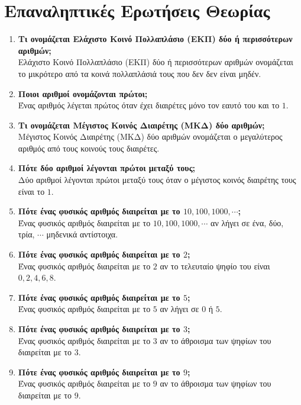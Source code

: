 \documentclass[a4paper,11pt]{report}
\begin{document}
\section*{Επαναληπτικές Ερωτήσεις Θεωρίας \hfill \small{}}
\begin{enumerate}
\item \textbf{Τι ονομάζεται Ελάχιστο Κοινό Πολλαπλάσιο (ΕΚΠ) δύο ή περισσότερων αριθμών;}\\
      Ελάχιστο Κοινό Πολλαπλάσιο (ΕΚΠ) δύο ή περισσότερων αριθμών ονομάζεται το μικρότερο από τα κοινά 
      πολλαπλάσιά τους που δεν  δεν είναι μηδέν.
\item \textbf{Ποιοι αριθμοί ονομάζονται πρώτοι;}\\
      Ένας αριθμός λέγεται πρώτος όταν έχει διαιρέτες μόνο τον εαυτό του και το $1$.
\item \textbf{Τι ονομάζεται Μέγιστος Κοινός Διαιρέτης (ΜΚΔ) δύο αριθμών;}\\
      Μέγιστος Κοινός Διαιρέτης (ΜΚΔ) δύο αριθμών ονομάζεται ο μεγαλύτερος αριθμός από τους κοινούς 
      τους διαιρέτες.
\item \textbf{Πότε δύο αριθμοί λέγονται πρώτοι μεταξύ τους;}\\
       Δύο αριθμοί λέγονται πρώτοι μεταξύ τους όταν ο μέγιστος κοινός διαιρέτης τους είναι το $1$.
\item \textbf{Πότε ένας φυσικός αριθμός διαιρείται με το $10,100,1000,\cdots$;}\\
      Ένας φυσικός αριθμός διαιρείται με το $10,100,1000,\cdots$ αν λήγει σε ένα, δύο, τρία, $\cdots$ μηδενικά 
      αντίστοιχα.
\item \textbf{Πότε ένας φυσικός αριθμός διαιρείται με το $2$;}\\
      Ένας φυσικός αριθμός διαιρείται με το $2$ αν το τελευταίο ψηφίο του είναι $0,2,4,6,8$.
\item \textbf{Πότε ένας φυσικός αριθμός διαιρείται με το $5$;}\\
      Ένας φυσικός αριθμός διαιρείται με το $5$ αν λήγει σε $0$ ή $5$.
\item \textbf{Πότε ένας φυσικός αριθμός διαιρείται με το $3$;}\\
      Ένας φυσικός αριθμός διαιρείται με το $3$ αν το άθροισμα των ψηφίων του διαιρείται με το $3$.
\item \textbf{Πότε ένας φυσικός αριθμός διαιρείται με το $9$;}\\
     Ένας φυσικός αριθμός διαιρείται με το $9$ αν το άθροισμα των ψηφίων του διαιρείται με το $9$.

\end{enumerate}
\end{document}

